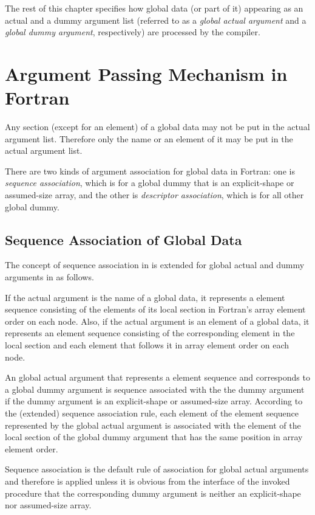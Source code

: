 \hspace{-1.2\parindent}
The rest of this chapter specifies how global data (or part of it)
appearing as an actual and a dummy argument list (referred to as a {\it
global actual argument} and a {\it global dummy argument}, respectively)
are processed by the {\XMP} compiler.


\section{Argument Passing Mechanism in {\XMP} Fortran}

Any section (except for an element) of a global data may not be put in
the actual argument list. Therefore only the name or an element of it
may be put in the actual argument list.

There are two kinds of argument association for global data in {\XMP}
Fortran: one is {\it sequence association}, which is for a global dummy
that is an explicit-shape or assumed-size array, and the other is
{\it descriptor association}, which is for all other global dummy.


\subsection{Sequence Association of Global Data}

The concept of sequence association in {\Fort} is extended for global
actual and dummy arguments in {\XMP} as follows.

If the actual argument is the name of a global data, it represents a
element sequence consisting of the elements of its local section in
Fortran's array element order on each node.
%
Also, if the actual argument is an element of a global data, it
represents an element sequence consisting of the corresponding element
in the local section and each element that follows it in array element
order on each node.

An global actual argument that represents a element sequence and
corresponds to a global dummy argument is sequence associated with
the the dummy argument if the dummy argument is an explicit-shape or
assumed-size array.
%
According to the (extended) sequence association rule, each element of
the element sequence represented by the global actual argument is
associated with the element of the local section of the global dummy
argument that has the same position in array element order.

Sequence association is the default rule of association for global
actual arguments and therefore is applied unless it is obvious from the
interface of the invoked procedure that the corresponding dummy argument
is neither an explicit-shape nor assumed-size array.


